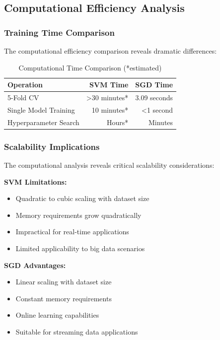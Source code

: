 \documentclass[12pt,a4paper]{article}
\begin{document}
\subsection{Computational Efficiency Analysis}

\subsubsection{Training Time Comparison}

The computational efficiency comparison reveals dramatic differences:

\begin{table}[H]
\centering
\begin{tabular}{@{}lrr@{}}
\toprule
\textbf{Operation} & \textbf{SVM Time} & \textbf{SGD Time} \\
\midrule
5-Fold CV & >30 minutes* & 3.09 seconds \\
Single Model Training & ~10 minutes* & <1 second \\
Hyperparameter Search & Hours* & Minutes \\
\bottomrule
\end{tabular}
\caption{Computational Time Comparison (*estimated)}
\end{table}

\subsubsection{Scalability Implications}

The computational analysis reveals critical scalability considerations:

\textbf{SVM Limitations:}
\begin{itemize}
    \item Quadratic to cubic scaling with dataset size
    \item Memory requirements grow quadratically
    \item Impractical for real-time applications
    \item Limited applicability to big data scenarios
\end{itemize}

\textbf{SGD Advantages:}
\begin{itemize}
    \item Linear scaling with dataset size
    \item Constant memory requirements
    \item Online learning capabilities
    \item Suitable for streaming data applications
\end{itemize}
\end{document}
